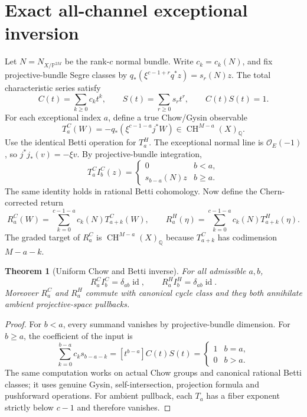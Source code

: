 \documentclass[11pt]{article}
\newcommand{\Q}{\mathbb Q}
\newcommand{\CH}{\operatorname{CH}}
\newtheorem{theorem}{Theorem}
\begin{document}
\section{Exact all-channel exceptional inversion}
Let $N=N_{X/\mathbb P^{2M}}$ be the rank-$c$ normal bundle.
Write $c_k=c_k(N)$, and fix projective-bundle Segre classes
by $q_*(\xi^{c-1+r}q^*z)=s_r(N)z$.
The total characteristic series satisfy
\[
 C(t)=\sum_{k\ge0}c_kt^k,\qquad
 S(t)=\sum_{r\ge0}s_rt^r,\qquad C(t)S(t)=1.
\]
For each exceptional index $a$, define a true Chow/Gysin observable
\[
 T_a^C(W)=-q_*(\xi^{c-1-a}j^*W)
       \in\CH^{M-a}(X)_{\Q}.
\]
Use the identical Betti operation for $T_a^H$.
The exceptional normal line is $\mathcal O_E(-1)$, so
$j^*j_*(v)=-\xi v$. By projective-bundle integration,
\[
 T_a^CI_b^C(z)=
 \begin{cases}
 0&b<a,\\
 s_{b-a}(N)z&b\ge a.
 \end{cases}
\]
The same identity holds in rational Betti cohomology.
Now define the Chern-corrected return
\[
 R_a^C(W)=\sum_{k=0}^{c-1-a}c_k(N)T_{a+k}^C(W),
\qquad
 R_a^H(\eta)=\sum_{k=0}^{c-1-a}c_k(N)T_{a+k}^H(\eta).
\]
The graded target of $R_a^C$ is $\CH^{M-a}(X)_{\Q}$
because $T_{a+k}^C$ has codimension $M-a-k$.
\begin{theorem}[Uniform Chow and Betti inverse]
For all admissible $a,b$,
\[
 R_a^CI_b^C=\delta_{ab}\operatorname{id},
 \qquad
 R_a^HI_b^H=\delta_{ab}\operatorname{id}.
\]
Moreover $R_a^C$ and $R_a^H$ commute with canonical cycle
class and they both annihilate ambient projective-space pullbacks.
\end{theorem}
\begin{proof}
For $b<a$, every summand vanishes by projective-bundle dimension.
For $b\ge a$, the coefficient of the input is
\[
 \sum_{k=0}^{b-a}c_ks_{b-a-k}=[t^{b-a}]C(t)S(t)
  =\begin{cases}1&b=a,\\0&b>a.\end{cases}
\]
The same computation works on actual Chow groups and canonical
rational Betti classes; it uses genuine Gysin, self-intersection,
projection formula and pushforward operations.
For ambient pullback, each $T_a$ has a fiber exponent strictly
below $c-1$ and therefore vanishes.
\end{proof}
\end{document}
